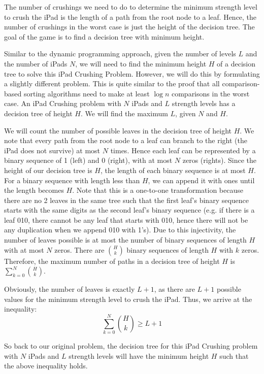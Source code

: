 \documentclass[12pt,a4paper,oneside]{report}
\begin{document}
The number of crushings we need to do to determine the minimum strength level to crush the iPad is the length of a path from the root node to a leaf. Hence, the number of crushings in the worst case is just the height of the decision tree. The goal of the game is to find a decision tree with minimum height.

Similar to the dynamic programming approach, given the number of levels $L$ and the number of iPads $N$, we will need to find the minimum height $H$ of a decision tree to solve this iPad Crushing Problem. However, we will do this by formulating a slightly different problem. This is quite similar to the proof that all comparison-based sorting algorithms need to make at least $\log n$ comparisons in the worst case. An iPad Crushing problem with $N$ iPads and $L$ strength levels has a decision tree of height $H$. We will find the maximum $L$, given $N$ and $H$.

We will count the number of possible leaves in the decision tree of height $H$. We note that every path from the root node to a leaf can branch to the right (the iPad does not survive) at most $N$ times. Hence each leaf can be represented by a binary sequence of 1 (left) and 0 (right), with at most $N$ zeros (rights). Since the height of our decision tree is $H$, the length of each binary sequence is at most $H$. For a binary sequence with length less than $H$, we can append it with ones until the length becomes $H$. Note that this is a one-to-one transformation because there are no 2 leaves in the same tree such that the first leaf's binary sequence starts with the same digits as the second leaf's binary sequence (e.g. if there is a leaf 010, there cannot be any leaf that starts with 010, hence there will not be any duplication when we append 010 with 1's). Due to this injectivity, the number of leaves possible is at most the number of binary sequences of length $H$ with at most $N$ zeros. There are ${H \choose k}$ binary sequences of length $H$ with $k$ zeros. Therefore, the maximum number of paths in a decision tree of height $H$ is $\sum_{k=0}^{N} {H \choose k}$.

Obviously, the number of  leaves is exactly $L+1$, as there are $L+1$ possible values for the minimum strength level to crush the iPad. Thus, we arrive at the inequality: \[\sum_{k=0}^{N} {H \choose k} \geq L+1\]

So back to our original problem, the decision tree for this iPad Crushing problem with $N$ iPads and $L$ strength levels will have the minimum height $H$ such that the above inequality holds.
\end{document}

